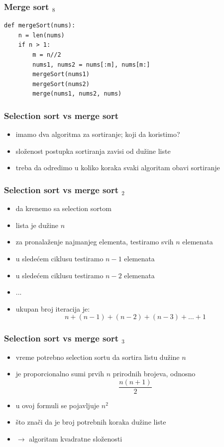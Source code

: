 \documentclass[utf8,compress]{beamer}
\begin{document}
\begin{frame}[fragile]
  \frametitle{Merge sort $_8$}
\begin{verbatim}
def mergeSort(nums):
    n = len(nums)
    if n > 1:
        m = n//2
        nums1, nums2 = nums[:m], nums[m:]
        mergeSort(nums1)
        mergeSort(nums2)
        merge(nums1, nums2, nums)
\end{verbatim}
\end{frame}

\begin{frame}[fragile]
  \frametitle{Selection sort vs merge sort}
  \begin{itemize}
    \item imamo dva algoritma za sortiranje; koji da koristimo?
    \item složenost postupka sortiranja zavisi od dužine liste
    \item treba da odredimo u koliko koraka svaki algoritam obavi sortiranje
  \end{itemize}
\end{frame}

\begin{frame}[fragile]
  \frametitle{Selection sort vs merge sort $_2$}
  \begin{itemize}
    \item da krenemo sa selection sortom
    \item lista je dužine $n$
    \item za pronalaženje najmanjeg elementa, testiramo svih $n$ elemenata
    \item u sledećem ciklusu testiramo $n-1$ elemenata
    \item u sledećem ciklusu testiramo $n-2$ elemenata
    \item ...
    \item ukupan broj iteracija je: \\
      $$ n + (n-1) + (n-2) + (n-3) + \ldots + 1 $$
  \end{itemize}
\end{frame}

\begin{frame}[fragile]
  \frametitle{Selection sort vs merge sort $_3$}
  \begin{itemize}
    \item vreme potrebno selection sortu da sortira listu dužine $n$
    \item je proporcionalno sumi prvih $n$ prirodnih brojeva, odnosno \\
      $$ \frac{n(n+1)}{2} $$
    \item u ovoj formuli se pojavljuje $n^2$
    \item što znači da je broj potrebnih koraka  dužine liste
    \item $\rightarrow$ algoritam kvadratne složenosti
  \end{itemize}
\end{frame}
\end{document}
